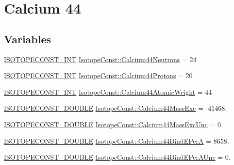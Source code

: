 \hypertarget{group___isotope_const-_calcium-_ca44}{}\section{Calcium 44}
\label{group___isotope_const-_calcium-_ca44}
\subsection*{Variables}
\begin{DoxyCompactItemize}
\item 
\mbox{\hyperlink{group___isotope_const-_macros_ga5f18360b3e99483a35c32d789e62621c}{I\+S\+O\+T\+O\+P\+E\+C\+O\+N\+S\+T\+\_\+\+I\+NT}} \mbox{\hyperlink{group___isotope_const-_calcium-_ca44_ga48d9f4f514e9c8116cafd4839502394c}{Isotope\+Const\+::\+Calcium44\+Neutrons}} = 24
\item 
\mbox{\hyperlink{group___isotope_const-_macros_ga5f18360b3e99483a35c32d789e62621c}{I\+S\+O\+T\+O\+P\+E\+C\+O\+N\+S\+T\+\_\+\+I\+NT}} \mbox{\hyperlink{group___isotope_const-_calcium-_ca44_ga090721eca90d41ba986a97578cc3de55}{Isotope\+Const\+::\+Calcium44\+Protons}} = 20
\item 
\mbox{\hyperlink{group___isotope_const-_macros_ga5f18360b3e99483a35c32d789e62621c}{I\+S\+O\+T\+O\+P\+E\+C\+O\+N\+S\+T\+\_\+\+I\+NT}} \mbox{\hyperlink{group___isotope_const-_calcium-_ca44_gab20966105f9f90ae563c1bcdf479c7ff}{Isotope\+Const\+::\+Calcium44\+Atomic\+Weight}} = 44
\item 
\mbox{\hyperlink{group___isotope_const-_macros_ga8f45a7272ce02c0b4c65c44636ed719a}{I\+S\+O\+T\+O\+P\+E\+C\+O\+N\+S\+T\+\_\+\+D\+O\+U\+B\+LE}} \mbox{\hyperlink{group___isotope_const-_calcium-_ca44_gaef13ce11724415096301cc6f36e69dec}{Isotope\+Const\+::\+Calcium44\+Mass\+Exc}} = -\/41468.
\item 
\mbox{\hyperlink{group___isotope_const-_macros_ga8f45a7272ce02c0b4c65c44636ed719a}{I\+S\+O\+T\+O\+P\+E\+C\+O\+N\+S\+T\+\_\+\+D\+O\+U\+B\+LE}} \mbox{\hyperlink{group___isotope_const-_calcium-_ca44_gaf11618891faf8be05a987027e7d49f24}{Isotope\+Const\+::\+Calcium44\+Mass\+Exc\+Unc}} = 0.
\item 
\mbox{\hyperlink{group___isotope_const-_macros_ga8f45a7272ce02c0b4c65c44636ed719a}{I\+S\+O\+T\+O\+P\+E\+C\+O\+N\+S\+T\+\_\+\+D\+O\+U\+B\+LE}} \mbox{\hyperlink{group___isotope_const-_calcium-_ca44_ga0845336452e276ab0f0d44d1cd2f961e}{Isotope\+Const\+::\+Calcium44\+Bind\+E\+PerA}} = 8658.
\item 
\mbox{\hyperlink{group___isotope_const-_macros_ga8f45a7272ce02c0b4c65c44636ed719a}{I\+S\+O\+T\+O\+P\+E\+C\+O\+N\+S\+T\+\_\+\+D\+O\+U\+B\+LE}} \mbox{\hyperlink{group___isotope_const-_calcium-_ca44_gac24a5ff58153c35161afdcb688218360}{Isotope\+Const\+::\+Calcium44\+Bind\+E\+Per\+A\+Unc}} = 0.

\end{DoxyCompactItemize}
